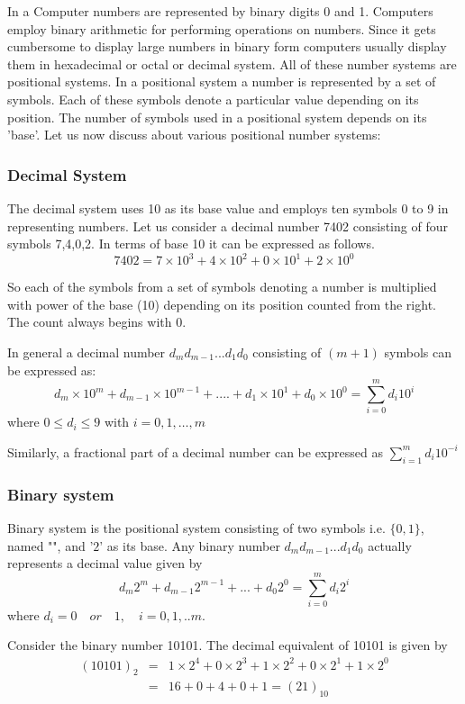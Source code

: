 	In a Computer numbers are represented by binary digits 0 and 1.
	Computers employ binary arithmetic for performing operations on
	numbers. Since it gets cumbersome to display large numbers in
	binary form computers usually display them in hexadecimal or octal
	or decimal system. All of these number systems are positional
	systems. In a positional system a number is represented by a set
	of symbols. Each of these symbols denote a particular value
	depending on its position. The number of symbols  used in a
	positional system depends on its 'base'. Let us now discuss about
	various positional number systems:
	
	\subsubsection{Decimal System}
	
	The decimal system uses 10 as its base value and employs ten
	symbols 0 to 9 in representing numbers. Let us consider a decimal
	number 7402 consisting of four symbols 7,4,0,2. In terms of base
	10 it can be expressed as follows.
	$$7402=7\times10^{3}+4\times10^{2}+0\times10^{1}+2\times10^{0}$$
	
	So each of the symbols from a set of symbols denoting a number is
	multiplied with power of the base (10) depending on its position
	counted from the right. The count always begins with 0.
	
	In general a decimal number $d_{m}d_{m-1}...d_{1}d_{0}$ consisting
	of $(m+1)$ symbols can be expressed as:
	$$
	d_{m}\times10^{m}+d_{m-1}\times10^{m-1}+....+d_{1}\times10^{1}+d_{0}\times10^{0}=\sum\limits_{i=0}^{m}
	d_{i}10^{i}
	$$
	where $0\leq d_{i}\leq 9$ with $i=0,1,\ldots, m$
	
	Similarly, a fractional part of a decimal number can be expressed
	as $\sum\limits_{i=1}^{m}d_{i}10^{-i}$
	
	\subsubsection{Binary system} 
	Binary system is the positional system 	consisting of two symbols i.e. $\{0,1\}$, named "\label{bit}", and '$2$' as its base. Any binary number $d_{m}d_{m-1}...d_{1}d_{0}$ actually represents a decimal value given by
	$$
	d_{m}2^{m}+d_{m-1}2^{m-1}+...+d_{0}2^{0}=\sum\limits_{i=0}^{m}
	d_{i}2^{i}
	$$
	where $d_{i}=0\quad or\quad 1, \quad i=0,1,..m. $
	
	Consider the binary number 10101. The decimal equivalent of 10101
	is given by
	\begin{eqnarray}
	(10101)_{2} & = & 1\times 2^{4}+0\times 2^{3}+1\times
	2^{2}+0\times 2^{1}+1\times 2^{0} \nonumber \\
	& = & 16+0+4+0+1=(21)_{10} \nonumber
	\end{eqnarray}
	
